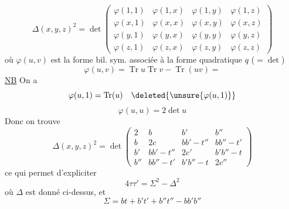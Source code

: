 \[
\Delta(x,y,z)^2=\det\begin{pmatrix}
\varphi(1,1)&\varphi(1,x)&\varphi(1,y)&\varphi(1,z)\\
\varphi(x,1)&\varphi(x,x)&\varphi(x,y)&\varphi(x,z)\\
\varphi(y,1)&\varphi(y,x)&\varphi(y,y)&\varphi(y,z)\\
\varphi(z,1)&\varphi(z,x)&\varphi(z,y)&\varphi(z,z)
\end{pmatrix}
\]
où $\varphi(u,v)$ est la forme bil. sym. associée à la forme quadratique $q$ ($=\det$)
\[
\varphi(u,v)=\operatorname{Tr}u\operatorname{Tr}v-\operatorname{Tr}(uv)=
\]
\uline{NB} On a
\[
\varphi(u,1)=\operatorname{Tr}(u)\quad\deleted{\unsure{\varphi(u,1)}}
\]
\[
\varphi(u,u)=2\det u
\]
Donc on trouve
\[
\boxed{\Delta(x,y,z)^2=\det\begin{pmatrix}
2&b&b'&b''\\
b&2c&bb'-t''&bb''-t'\\
b'&bb'-t''&2c'&b'b''-t\\
b''&bb''-t'&b'b''-t&2c''
\end{pmatrix}}
\]
ce qui permet d'expliciter
\[
4\tau\tau'=\Sigma^2-\Delta^2
\]
où $\Delta$ est donné ci-dessus, et
\[
\boxed{\Sigma=bt+b't'+b''t''-bb'b''}
\]
